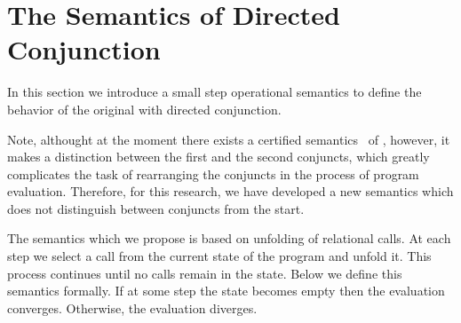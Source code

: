 \section{The Semantics of Directed Conjunction}
In this section we introduce a small step operational semantics to define the behavior of the original \mk with directed conjunction. 


Note, althought at the moment there exists a certified semantics~\cite{fair:semantics} of \mk, however, it makes a distinction between the first
and the second conjuncts, which greatly complicates the task of rearranging the conjuncts in the process of program evaluation. 
Therefore, for this research, we have developed a new semantics which does not distinguish between conjuncts from the start.


The semantics which we propose is based on unfolding of relational calls. At each step we select a call from the current state of the program and unfold it.
This process continues until no calls remain in the state. Below we define this semantics formally. If at some step the state becomes empty then the evaluation converges. Otherwise, the evaluation diverges.


